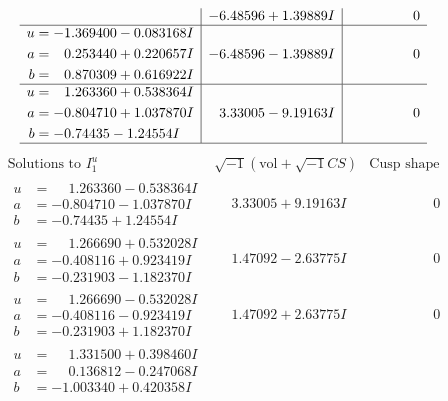 \documentclass[1p]{elsarticle_modified}
\theoremstyle{definition}
\newcommand{\I}{\sqrt{-1}}
\begin{document}
$$\begin{array}{c|c|c}
 & -6.48596 + 1.39889 I & \phantom{-0.000000 } 0 \\ \hline\begin{aligned}
u &= -1.369400 - 0.083168 I \\
a &= \phantom{-}0.253440 + 0.220657 I \\
b &= \phantom{-}0.870309 + 0.616922 I\end{aligned}
 & -6.48596 - 1.39889 I & \phantom{-0.000000 } 0 \\ \hline\begin{aligned}
u &= \phantom{-}1.263360 + 0.538364 I \\
a &= -0.804710 + 1.037870 I \\
b &= -0.74435 - 1.24554 I\end{aligned}
 & \phantom{-}3.33005 - 9.19163 I & \phantom{-0.000000 } 0\\
 \hline 
 \end{array}$$\newpage$$\begin{array}{c|c|c}  
\text{Solutions to }I^u_{1}& \I (\text{vol} + \sqrt{-1}CS) & \text{Cusp shape}\\
 \hline 
\begin{aligned}
u &= \phantom{-}1.263360 - 0.538364 I \\
a &= -0.804710 - 1.037870 I \\
b &= -0.74435 + 1.24554 I\end{aligned}
 & \phantom{-}3.33005 + 9.19163 I & \phantom{-0.000000 } 0 \\ \hline\begin{aligned}
u &= \phantom{-}1.266690 + 0.532028 I \\
a &= -0.408116 + 0.923419 I \\
b &= -0.231903 - 1.182370 I\end{aligned}
 & \phantom{-}1.47092 - 2.63775 I & \phantom{-0.000000 } 0 \\ \hline\begin{aligned}
u &= \phantom{-}1.266690 - 0.532028 I \\
a &= -0.408116 - 0.923419 I \\
b &= -0.231903 + 1.182370 I\end{aligned}
 & \phantom{-}1.47092 + 2.63775 I & \phantom{-0.000000 } 0 \\ \hline\begin{aligned}
u &= \phantom{-}1.331500 + 0.398460 I \\
a &= \phantom{-}0.136812 - 0.247068 I \\
b &= -1.003340 + 0.420358 I\end{aligned}

\end{array}$$
\end{document}
